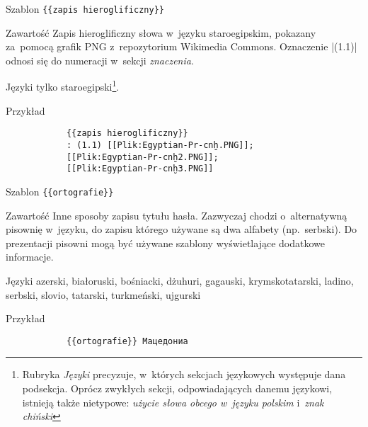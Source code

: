 \begin{opis}
	\item[Szablon] \verb|{{zapis hieroglificzny}}|
	\item[Zawartość] Zapis hieroglificzny słowa w~języku staroegipskim, pokazany za~pomocą grafik PNG z~repozytorium Wikimedia Commons. Oznaczenie \kod|(1.1)| odnosi się do numeracji w~sekcji \emph{znaczenia}.
	\item[Języki] tylko staroegipski\footnote{Rubryka \emph{Języki} precyzuje, w~których sekcjach językowych występuje dana podsekcja. Oprócz zwykłych sekcji, odpowiadających danemu językowi, istnieją także nietypowe: \emph{użycie słowa obcego w~języku polskim} i~\emph{znak chiński}}.
	\item[Przykład]
		\begin{verbatim}
			{{zapis hieroglificzny}}
			: (1.1) [[Plik:Egyptian-Pr-cnḫ.PNG]];
			[[Plik:Egyptian-Pr-cnḫ2.PNG]];
			[[Plik:Egyptian-Pr-cnḫ3.PNG]]
		\end{verbatim}
\end{opis}
\spacer
\begin{opis}
	\item[Szablon] \verb|{{ortografie}}|
	\item[Zawartość] Inne sposoby zapisu tytułu hasła. Zazwyczaj chodzi o~alternatywną pisownię w~języku, do zapisu którego używane są dwa alfabety (np.\ serbski). Do prezentacji pisowni mogą być używane szablony wyświetlające dodatkowe informacje.
	\item[Języki] azerski, białoruski, bośniacki, dżuhuri, gagauski, krymskotatarski, ladino, serbski, slovio, tatarski, turkmeński, ujgurski
	\item[Przykład]
		\begin{verbatim}
			{{ortografie}} Мацедониа
		\end{verbatim}
\end{opis}
\spacer
